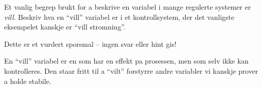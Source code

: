 

Et vanlig begrep brukt for a beskrive en variabel i mange regulerte systemer er {\it vill}.  Beskriv hva en ``vill'' variabel er i et kontrollsystem, der det vanligste eksempelet kanskje er ``vill stromning''.

\vfil

\eject






Dette er et vurdert sporsmal -- ingen svar eller hint gis!







En ``vill'' variabel er en som har en effekt pa prosessen, men som selv ikke kan kontrolleres.  Den staar fritt til a ``vilt'' forstyrre andre variabler vi kanskje prover a holde stabile.





